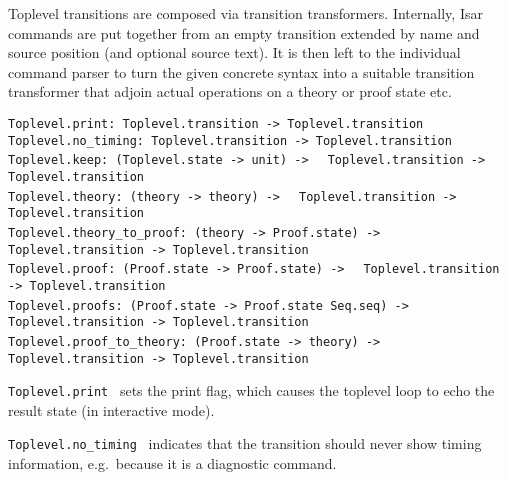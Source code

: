 \begin{isabellebody}
\begin{isamarkuptext}
  Toplevel transitions are composed via transition transformers.
  Internally, Isar commands are put together from an empty transition
  extended by name and source position (and optional source text).  It
  is then left to the individual command parser to turn the given
  concrete syntax into a suitable transition transformer that adjoin
  actual operations on a theory or proof state etc.%
\end{isamarkuptext}%
\isamarkuptrue%
%
\isadelimmlref
%
\endisadelimmlref
%
\isatagmlref
%
\begin{isamarkuptext}%
\begin{mldecls}
  \verb|Toplevel.print: Toplevel.transition -> Toplevel.transition| \\
  \verb|Toplevel.no_timing: Toplevel.transition -> Toplevel.transition| \\
  \verb|Toplevel.keep: (Toplevel.state -> unit) ->|\isasep\isanewline%
\verb|  Toplevel.transition -> Toplevel.transition| \\
  \verb|Toplevel.theory: (theory -> theory) ->|\isasep\isanewline%
\verb|  Toplevel.transition -> Toplevel.transition| \\
  \verb|Toplevel.theory_to_proof: (theory -> Proof.state) ->|\isasep\isanewline%
\verb|  Toplevel.transition -> Toplevel.transition| \\
  \verb|Toplevel.proof: (Proof.state -> Proof.state) ->|\isasep\isanewline%
\verb|  Toplevel.transition -> Toplevel.transition| \\
  \verb|Toplevel.proofs: (Proof.state -> Proof.state Seq.seq) ->|\isasep\isanewline%
\verb|  Toplevel.transition -> Toplevel.transition| \\
  \verb|Toplevel.proof_to_theory: (Proof.state -> theory) ->|\isasep\isanewline%
\verb|  Toplevel.transition -> Toplevel.transition| \\
  \end{mldecls}

  \begin{description}

  \item \verb|Toplevel.print|~ sets the print flag, which
  causes the toplevel loop to echo the result state (in interactive
  mode).

  \item \verb|Toplevel.no_timing|~ indicates that the
  transition should never show timing information, e.g.\ because it is
  a diagnostic command.


\end{description}
\end{isamarkuptext}
\end{isabellebody}
